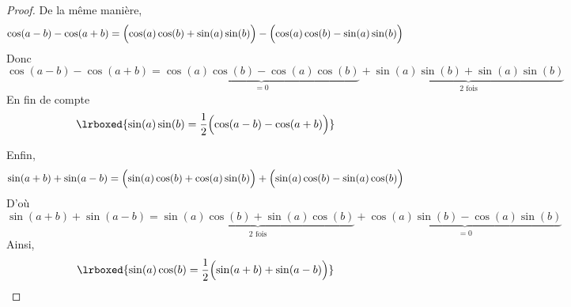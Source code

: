 \begin{proof}
De la même manière, 
\[
\cos(a-b) - \cos(a+b) = \Bigl(\cos(a)\cos(b)+\sin(a)\sin(b)\Bigr) - \Bigl(\cos(a)\cos(b)-\sin(a)\sin(b)\Bigr)
\]
Donc 
\[
\cos(a-b) - \cos(a+b) = \underbrace{\cos(a)\cos(b) - \cos(a)\cos(b)}_{=0} + \underbrace{\sin(a)\sin(b) + \sin(a)\sin(b)}_{\text{$2$ fois}}
\]
En fin de compte 
\[
\lrboxed{\sin(a)\sin(b) = \dfrac{1}{2}\Bigl(\cos(a-b)-\cos(a+b)\Bigr)}
\]

Enfin, 
\[
\sin(a+b)+\sin(a-b)=\Bigl(\sin(a)\cos(b)+\cos(a)\sin(b)\Bigr) + \Bigl(\sin(a)\cos(b)-\sin(a)\cos(b)\Bigr)
\]
D'où 
\[
\sin(a+b)+\sin(a-b)= \underbrace{\sin(a)\cos(b) + \sin(a)\cos(b)}_{\text{$2$ fois}} + \underbrace{\cos(a)\sin(b) - \cos(a)\sin(b)}_{=0}
\]
Ainsi, 
\[
\lrboxed{\sin(a)\cos(b) = \dfrac{1}{2}\Bigl(\sin(a+b)+\sin(a-b)\Bigr)}
\]
\end{proof}